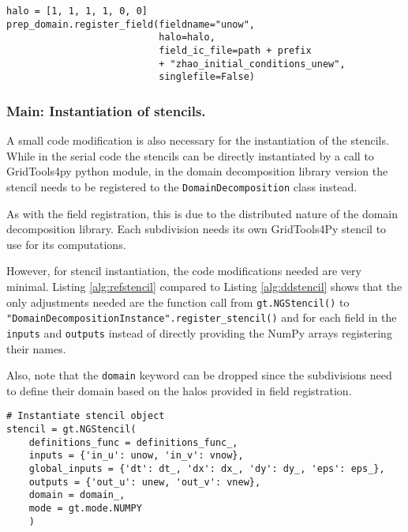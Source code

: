 \begin{lstlisting}[caption={Example code for field instantiation using the domain decomposition library in the case where the initial condtions where written to a file per subdivision.},captionpos=b, label={alg:ddinstant}, float, floatplacement=H]
halo = [1, 1, 1, 1, 0, 0]
prep_domain.register_field(fieldname="unow",
                           halo=halo,
                           field_ic_file=path + prefix 
                           + "zhao_initial_conditions_unew",
                           singlefile=False)
\end{lstlisting}

\subsubsection{Main: Instantiation of stencils.}
A small code modification is also necessary for the instantiation of the stencils.
While in the serial code the stencils can be directly instantiated by a call to GridTools4py python module, in the domain decomposition library version the stencil needs to be registered to the \texttt{DomainDecomposition} class instead.

As with the field registration, this is due to the distributed nature of the domain decomposition library.
Each subdivision needs its own GridTools4Py stencil to use for its computations.

However, for stencil instantiation, the code modifications needed are very minimal.
Listing \ref{alg:refstencil} compared to Listing \ref{alg:ddstencil} shows that the only adjustments needed are the function call from \texttt{gt.NGStencil()} to \texttt{"DomainDecompositionInstance".register\_stencil()} and for each field in the \texttt{inputs} and \texttt{outputs} instead of directly providing the NumPy arrays registering their names.

Also, note that the \texttt{domain} keyword can be dropped since the subdivisions need to define their domain based on the halos provided in field registration.

\begin{lstlisting}[caption={Example code for the original user stencil instantiation.},captionpos=b, label={alg:refstencil}, float, floatplacement=H]
# Instantiate stencil object
stencil = gt.NGStencil(
    definitions_func = definitions_func_,
    inputs = {'in_u': unow, 'in_v': vnow},
    global_inputs = {'dt': dt_, 'dx': dx_, 'dy': dy_, 'eps': eps_},
    outputs = {'out_u': unew, 'out_v': vnew},
    domain = domain_,
    mode = gt.mode.NUMPY
    )
\end{lstlisting}

